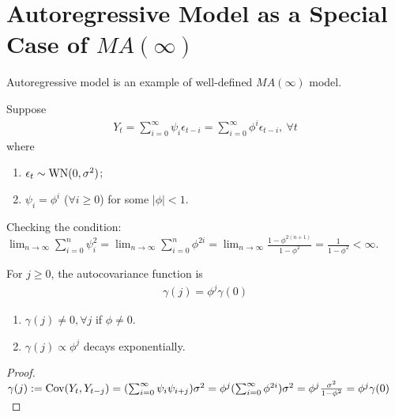 \documentclass[11pt]{elegantbook}
\begin{document}
\section{Autoregressive Model as a Special Case of $MA(\infty)$}
Autoregressive model is an example of well-defined $MA(\infty)$ model.
\begin{example}
    Suppose
    \begin{equation}
        \begin{aligned}
            Y_{t}=\sum_{i=0}^\infty \psi_i\epsilon_{t-i}=\sum_{i=0}^\infty \phi^i\epsilon_{t-i},\ \forall t
        \end{aligned}
        \nonumber
    \end{equation}
    where
    \begin{enumerate}[$\circ$]
        \item $\epsilon_t\sim \textnormal{WN}(0,\sigma^2)$;
        \item $\psi_i=\phi^i$ ($\forall i\geq 0$) for some $|\phi|<1$.
    \end{enumerate}
\end{example}
Checking the condition: $\lim_{n \rightarrow \infty}\sum_{i=0}^n\psi_i^2=\lim_{n \rightarrow \infty}\sum_{i=0}^n\phi^{2i}=\lim_{n \rightarrow \infty}\frac{1-\phi^{2(n+1)}}{1-\phi^2}=\frac{1}{1-\phi^2}<\infty$.

\begin{lemma}
    For $j\geq 0$, the autocovariance function is
    \begin{equation}
        \begin{aligned}
            \gamma(j)=\phi^j \gamma(0)
        \end{aligned}
        \nonumber
    \end{equation}
    \begin{note}
        \begin{enumerate}
            \item $\gamma(j)\neq 0, \forall j$ if $\phi\neq 0$.
            \item $\gamma(j)\propto \phi^j$ decays exponentially.
        \end{enumerate}
    \end{note}
\end{lemma}
\begin{proof}
    $\gamma(j):=\textnormal{Cov}(Y_t,Y_{t-j})=(\sum_{i=0}^{\infty}\psi_i\psi_{i+j})\sigma^2=\phi^{j}(\sum_{i=0}^{\infty}\phi^{2i})\sigma^2=\phi^j\frac{\sigma^2}{1-\phi^2}=\phi^j \gamma(0)$
\end{proof}
\end{document}
